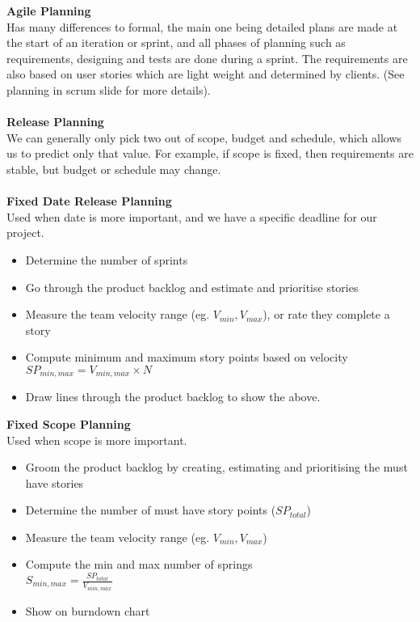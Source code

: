 \documentclass[a4paper,10pt]{article}
\begin{document}
\noindent \textcolor{BlueGreen}{\textbf{Agile Planning}} \\
Has many differences to formal, the main one being detailed plans are made at the start of an iteration or sprint, and all phases of planning such as requirements, designing and tests are done during a sprint. The requirements are also based on user stories which are light weight and determined by clients. (See planning in scrum slide for more details). \\\\
\textcolor{BlueGreen}{\textbf{Release Planning}} \\
We can generally only pick two out of scope, budget and schedule, which allows us to predict only that value. For example, if scope is fixed, then requirements are stable, but budget or schedule may change. \\\\
\textcolor{BlueGreen}{\textbf{Fixed Date Release Planning}} \\
Used when date is more important, and we have a specific deadline for our project.  
\begin{itemize}
	\item Determine the number of sprints
	\item Go through the product backlog and estimate and prioritise stories 
	\item Measure the team velocity range (eg. $V_{min}, V_{max}$), or rate they complete a story
	\item Compute minimum and maximum story points based on velocity \\
	$SP_{min,max} = V_{min, max} \times N$ 
	\item Draw lines through the product backlog to show the above. 
\end{itemize}
\textcolor{BlueGreen}{\textbf{Fixed Scope Planning}} \\
Used when scope is more important. 
\begin{itemize}
	\item Groom the product backlog by creating, estimating and prioritising the must have stories 
	\item Determine the number of must have story points ($SP_{total}$)
	\item Measure the team velocity range (eg. $V_{min}, V_{max}$)
	\item Compute the min and max number of springs  \\
	$S_{min,max} = \frac{SP_{total}}{V_{min,max}}$
	\item Show on burndown chart
\end{itemize}
\newpage 
\end{document}
